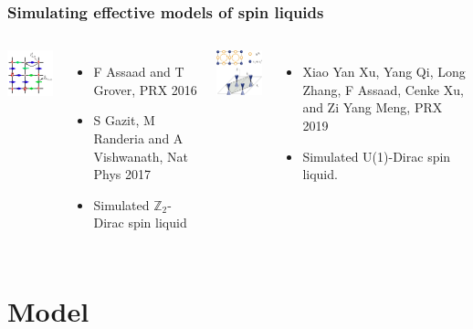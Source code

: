 \documentclass[xcolor=table, 10pt, aspectratio=43]{beamer}
\begin{document}
\begin{frame}
	\frametitle{Simulating effective models of spin liquids}
	\begin{columns}
		\begin{center}
			\includegraphics[width=4cm]{z2dsl}
		\end{center}
		\begin{itemize}
			\item F Assaad and T Grover, PRX 2016
			\item S Gazit, M Randeria and A Vishwanath, Nat Phys 2017
			\item Simulated $\mathbb Z_2$-Dirac spin liquid
		\end{itemize}
		\begin{center}
			\includegraphics[width=4cm]{u1dsl}
		\end{center}
		\begin{itemize}
			\item Xiao Yan Xu, Yang Qi, Long Zhang, F Assaad, Cenke Xu, and Zi Yang Meng, PRX 2019
			\item Simulated U(1)-Dirac spin liquid.
		\end{itemize}
	\end{columns}
\end{frame}

\section{Model}
\end{document}

